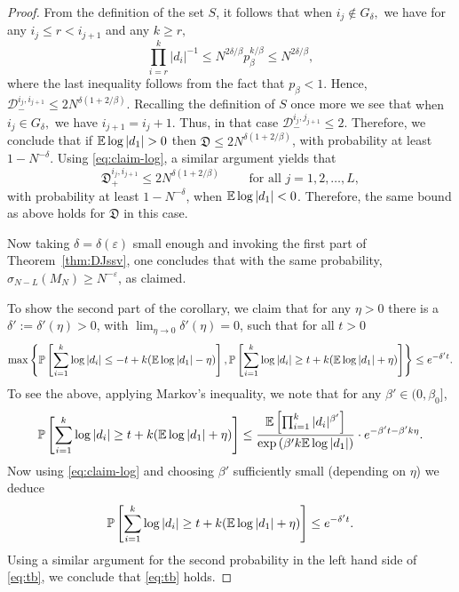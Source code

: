 \documentclass{amsart}
\numberwithin{equation}{section}
\def\corAB{}
\def\corOZ{}
\begin{document}
\begin{proof}
  \corAB{From the definition of the set $S$, it follows that} when $i_j \not \in G_{\delta},$ we have for any $i_j \leq r < i_{j+1}$ and any $k \geq r,$
  \[
  \prod_{i=r}^k |d_i|^{-1} \leq N^{2\delta/\beta} p_\beta^{k/\beta} \leq N^{2\delta/\beta},
  \]
  \corAB{where the last inequality follows from the fact that $p_\beta < 1$}. Hence, $\mathcal{D}_{-}^{i_j,i_{j+1}} \leq 2N^{\delta(1+2/\beta)}.$ \corAB{Recalling the definition of $S$ once more we see that} when $i_j \in G_{\delta},$ we have $i_{j+1} = i_j + 1$. Thus, in that case $\mathcal{D}_{-}^{i_j,j_{j+1}} \leq 2.$  Therefore, we conclude
  that if $\E\log |d_1|>0$ then
  $\mathfrak{D} \leq 2N^{\delta(1+2/\beta)}$,
  with probability at least $1-N^{-\delta}$. \corAB{Using \eqref{eq:claim-log}, a similar argument yields that
  \begin{equation}\label{eq:D_+}
  \mathfrak{D}_+^{i_j,i_{j+1}} \le 2 N^{\delta(1+2/\beta)} \qquad \text{ for all } j =1,2,\ldots,L,
  \end{equation}
  with probability at least $1-N^{-\delta}$, when $\mathbb E \log |d_1| <0$. Therefore, the same bound as above holds for $\mathfrak{D}$ in this case.}

  Now taking $\delta=\delta(\varepsilon)$ small
  enough and invoking the first part of Theorem~\ref{thm:DJssv},
  one concludes that with the same probability,
  $\sigma_{N-L}(M_N) \geq N^{-\varepsilon}$, as claimed.

  To show the second part of the corollary,
  \corAB{we claim that for any $\eta > 0$ there is a $\delta':=\delta'(\eta) > 0$, with $\lim_{\eta \to 0} \delta'(\eta)=0$, such that for all $t>0$}
  \begin{equation}
    \label{eq:tb}
  \max\left\{ \mathbb P\left[ \sum_{i=1}^k \log |d_i| \leq -t + k(\mathbb{E} \log|d_1| -\eta)\right],
  \mathbb P\left[ \sum_{i=1}^k \log |d_i| \geq t + k(\mathbb{E} \log|d_1|+\eta)\right]
   \right\} \leq e^{-\delta' t}.
  \end{equation}
 \corAB{To see the above, applying Markov's inequality, we note that for any $\beta' \in (0,\beta_0]$,
  \[
  \mathbb P\left[ \sum_{i=1}^k \log |d_i| \geq t + k(\mathbb{E} \log|d_1|+\eta)\right] \le \frac{\mathbb E\left[ \prod_{i=1}^k |d_i|^{\beta'}\right]}{\exp\left(\beta' k \mathbb E\log |d_1|\right)} \cdot e^{-\beta' t - \beta' k \eta}.
  \]
 Now using \eqref{eq:claim-log} and choosing $\beta'$ sufficiently small (depending on $\eta$) we deduce
  \[
  \mathbb P\left[ \sum_{i=1}^k \log |d_i| \geq t + k(\mathbb{E} \log|d_1|+\eta)\right] \le e^{-\delta' t}.
  \]
Using a similar argument} \corOZ{for the second probability in
  the left hand side of \eqref{eq:tb},  we conclude that
  \eqref{eq:tb} holds.}


\end{proof}
\end{document}
